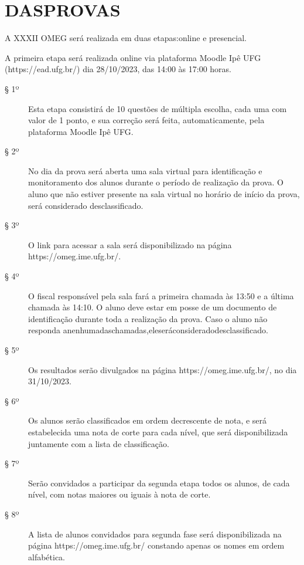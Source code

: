 \section{DASPROVAS}

\begin{article}
  A XXXII OMEG será realizada em duas etapas:online e presencial.
\end{article}

\begin{article}
  A primeira etapa será realizada online via plataforma Moodle Ipê UFG
  (https://ead.ufg.br/) dia 28/10/2023, das 14:00 às 17:00 horas.
  \begin{description}
    \item[§ 1º]
      Esta etapa consistirá de 10 questões de múltipla escolha, cada uma com
      valor de 1 ponto, e sua correção será feita, automaticamente, pela plataforma
      Moodle Ipê UFG.
    \item[§ 2º]
      No dia da prova será aberta uma sala virtual para identificação e
      monitoramento dos alunos durante o período de realização da prova. O
      aluno que não estiver presente na sala virtual no horário de início da
      prova, será considerado desclassificado.
    \item[§ 3º]
      O link para acessar a sala será disponibilizado na página
      https://omeg.ime.ufg.br/.
    \item[§ 4º]
      O fiscal responsável pela sala fará a primeira chamada às 13:50 e a
      última chamada às 14:10. O aluno deve estar em posse de um documento de
      identificação durante toda a realização da prova. Caso o aluno não responda
      anenhumadaschamadas,eleseráconsideradodesclassificado.
    \item[§ 5º]
      Os resultados serão divulgados na página https://omeg.ime.ufg.br/, no dia
      31/10/2023.
    \item[§ 6º]
      Os alunos serão classificados em ordem decrescente de nota, e será
      estabelecida uma nota de corte para cada nível, que será disponibilizada
      juntamente com a lista de classificação.
    \item[§ 7º]
      Serão convidados a participar da segunda etapa todos os alunos, de cada
      nível, com notas maiores ou iguais à nota de corte.
    \item[§ 8º]
      A lista de alunos convidados para segunda fase será disponibilizada na
      página https://omeg.ime.ufg.br/ constando apenas os nomes em ordem
      alfabética.
  \end{description}
\end{article}

